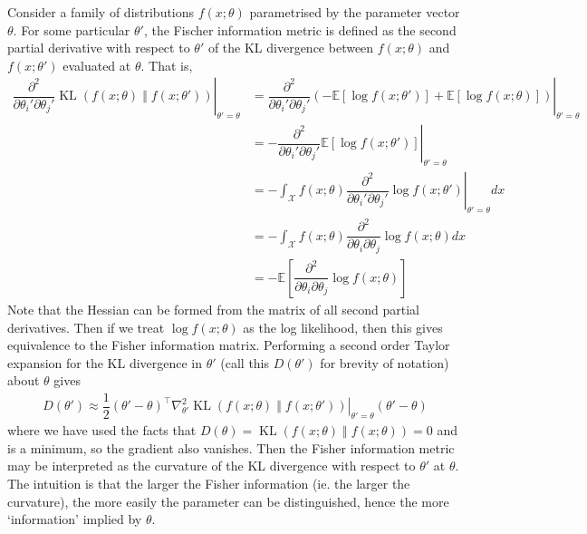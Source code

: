 \documentclass[11pt]{report} %
\begin{document}
Consider a family of distributions $f\left(x;\theta\right)$ parametrised by the parameter vector $\theta$. For some particular $\theta'$, the Fischer information metric is defined as the second partial derivative with respect to $\theta'$ of the KL divergence between $f\left(x;\theta\right)$ and $f\left(x;\theta'\right)$ evaluated at $\theta$. That is,
\begin{align}
\left.\dfrac{\partial^{2}}{\partial\theta_{i}'\partial\theta_{j}'}\operatorname{KL}\left(f\left(x;\theta\right)\middle\Vert f\left(x;\theta'\right)\right)\right|_{\theta' = \theta} &= \left.\dfrac{\partial^{2}}{\partial\theta_{i}'\partial\theta_{j}'}\left(-\mathbb{E}\left[\log f\left(x;\theta'\right)\right] + \mathbb{E}\left[\log f\left(x;\theta\right)\right]\right)\right|_{\theta' = \theta} \\
&= -\left.\dfrac{\partial^{2}}{\partial\theta_{i}'\partial\theta_{j}'}\mathbb{E}\left[\log f\left(x;\theta'\right)\right]\right|_{\theta' = \theta} \\
&= -\int_{\mathcal{X}}f\left(x;\theta\right)\left.\dfrac{\partial^{2}}{\partial\theta_{i}'\partial\theta_{j}'}\log f\left(x;\theta'\right)\right|_{\theta' = \theta}dx \\
&= -\int_{\mathcal{X}}f\left(x;\theta\right)\dfrac{\partial^{2}}{\partial\theta_{i}\partial\theta_{j}}\log f\left(x;\theta\right)dx \\
&= -\mathbb{E}\left[\dfrac{\partial^{2}}{\partial\theta_{i}\partial\theta_{j}}\log f\left(x;\theta\right)\right]
\end{align}
Note that the Hessian can be formed from the matrix of all second partial derivatives. Then if we treat $\log f\left(x;\theta\right)$ as the log likelihood, then this gives equivalence to the Fisher information matrix. Performing a second order Taylor expansion for the KL divergence in $\theta'$ (call this $D\left(\theta'\right)$ for brevity of notation) about $\theta$ gives
\begin{align}
D\left(\theta'\right) \approx \dfrac{1}{2}\left(\theta' - \theta\right)^{\top}\left.\nabla_{\theta'}^{2}\operatorname{KL}\left(f\left(x;\theta\right)\middle\Vert f\left(x;\theta'\right)\right)\right|_{\theta' = \theta}\left(\theta' - \theta\right)
\end{align}
where we have used the facts that $D\left(\theta\right) = \operatorname{KL}\left(f\left(x;\theta\right)\middle\Vert f\left(x;\theta\right)\right) = 0$ and is a minimum, so the gradient also vanishes. Then the Fisher information metric may be interpreted as the curvature of the KL divergence with respect to $\theta'$ at $\theta$. The intuition is that the larger the Fisher information (ie. the larger the curvature), the more easily the parameter can be distinguished, hence the more `information' implied by $\theta$.
\end{document}
